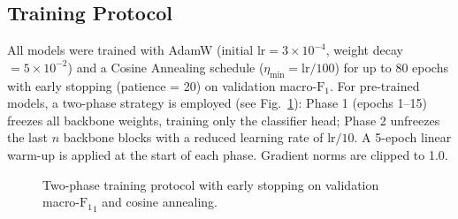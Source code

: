 \documentclass[conference]{IEEEtran}
\newcommand{\F}{\mathrm{F_1}}
\begin{document}
\subsection{Training Protocol}
\label{sec:training}

All models were trained with AdamW (initial lr$=3\!\times\!10^{-4}$,
weight decay $= 5\!\times\!10^{-2}$) and a Cosine Annealing
schedule ($\eta_\text{min} = \text{lr}/100$) for up to 80 epochs
with early stopping (patience = 20) on validation macro-$\F$.
For pre-trained models, a two-phase strategy is employed (see
Fig.~\ref{fig:training}):
Phase 1 (epochs 1--15) freezes all backbone weights, training
only the classifier head; Phase 2 unfreezes the last $n$
backbone blocks with a reduced learning rate of lr$/10$. A
5-epoch linear warm-up is applied at the start of each phase.
Gradient norms are clipped to 1.0.

\begin{figure}[!t]
\centering
{}
\caption{Two-phase training protocol with early stopping on
validation macro-$\F_1$ and cosine annealing.}
\label{fig:training}
\end{figure}
\end{document}

